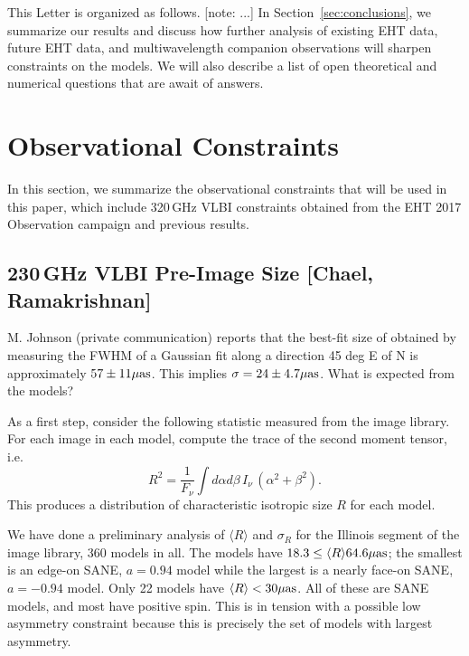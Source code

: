 \documentclass[twocolumn,tighten,dvipsnames,linenumbers]{aastex63}
\newcommand\note[1]{{\color{OliveGreen}[note: #1]}}
\begin{document}

This Letter is organized as follows.
\note{...}
In Section~\ref{sec:conclusions}, we summarize our results and discuss
how further analysis of existing EHT data, future EHT data, and
multiwavelength companion observations will sharpen constraints on the
models.
We will also describe a list of open theoretical and numerical
questions that are await of answers.

\section{Observational Constraints}
\label{sec:constraints}

In this section, we summarize the observational constraints that will
be used in this paper, which include 320\,GHz VLBI constraints
obtained from the EHT 2017 Observation campaign and previous results.

\subsection{230\,GHz VLBI Pre-Image Size
  [Chael, Ramakrishnan]}
\label{sec:230size}

M. Johnson (private communication) reports that the best-fit size of \sgra obtained by measuring the FWHM of a Gaussian fit along a direction 45 deg E of N is approximately $57 \pm 11 \mathrm{\mu as}$.  This implies $\sigma = 24 \pm 4.7 \mathrm{\mu as}$.  What is expected from the models?

As a first step, consider the following statistic measured from the image library.  For each image in each model, compute the trace of the second moment tensor, i.e.
\begin{equation}
  R^2 = \frac{1}{F_\nu} \int d\alpha d\beta \, I_\nu \, (\alpha^2 + \beta^2).
\end{equation}
This produces a distribution of characteristic isotropic size $R$ for each model.

We have done a preliminary analysis of $\langle R \rangle$ and $\sigma_R$ for the Illinois segment of the image library, 360 models in all.  The models have  $18.3 \le \langle R \rangle 64.6 \mathrm{\mu as}$; the smallest is an edge-on SANE, $a = 0.94$ model while the largest is a nearly face-on SANE, $a = -0.94$ model.  Only 22 models have $\langle R \rangle < 30\mathrm{\mu as}$.  All of these are SANE models, and most have positive spin.  This is in tension with a possible low  asymmetry constraint because this is precisely the set of models with largest asymmetry.
\end{document}

